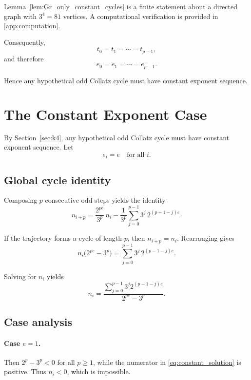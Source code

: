 \documentclass[11pt]{article}
\theoremstyle{definition}
\theoremstyle{plain}
\theoremstyle{remark}
\begin{document}
Lemma~\ref{lem:Gr_only_constant_cycles} is a finite statement about a directed graph
with $3^4=81$ vertices.
A computational verification is provided in \ref{app:computation}.

Consequently,
\[
t_0=t_1=\cdots=t_{p-1},
\]
and therefore
\[
e_0=e_1=\cdots=e_{p-1}.
\]

Hence any hypothetical odd Collatz cycle must have constant exponent sequence.

\section{The Constant Exponent Case}\label{sec:const}

By Section~\ref{sec:k4}, any hypothetical odd Collatz cycle must have constant exponent
sequence. Let
\[
e_i = e
\quad\text{for all } i.
\]

\subsection{Global cycle identity}

Composing $p$ consecutive odd steps yields the identity
\[
n_{i+p}
=
\frac{2^{pe}}{3^p}\, n_i
-
\frac{1}{3^p}
\sum_{j=0}^{p-1}
3^{j}\, 2^{(p-1-j)e}.
\]

If the trajectory forms a cycle of length $p$, then $n_{i+p}=n_i$.
Rearranging gives
\begin{equation}\label{eq:constant_cycle_identity}
n_i\bigl(2^{pe}-3^p\bigr)
=
\sum_{j=0}^{p-1}
3^{j}\, 2^{(p-1-j)e}.
\end{equation}

Solving for $n_i$ yields
\begin{equation}\label{eq:constant_solution}
n_i
=
\frac{\displaystyle\sum_{j=0}^{p-1}3^{j}2^{(p-1-j)e}}
{2^{pe}-3^p}.
\end{equation}

\subsection{Case analysis}

\paragraph{Case $e=1$.}

Then $2^{p}-3^p<0$ for all $p\ge1$, while the numerator in
\eqref{eq:constant_solution} is positive.
Thus $n_i<0$, which is impossible.
\end{document}
